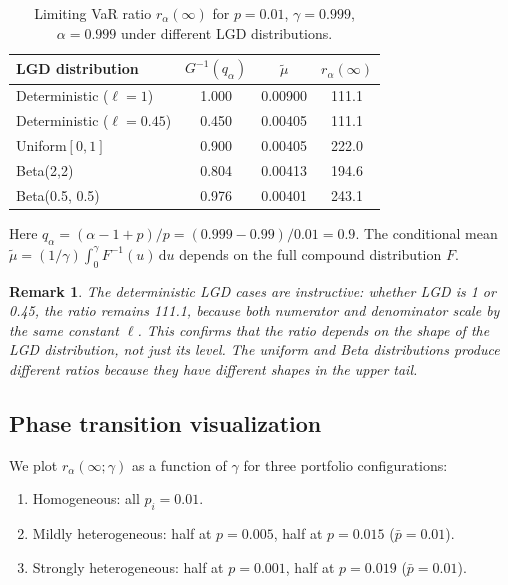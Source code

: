 \documentclass[11pt]{article}
\newtheorem{remark}[theorem]{Remark}
\theoremstyle{definition}
\newcommand{\dd}{\mathrm{d}}
\newcommand{\1}{\mathbf{1}}
\begin{document}
\begin{table}[h]
\centering
\caption{Limiting VaR ratio $r_\alpha(\infty)$ for $p = 0.01$, $\gamma = 0.999$, $\alpha = 0.999$ under different LGD distributions.}
\label{tab:lgd_comparison}
\begin{tabular}{lccc}
\toprule
LGD distribution & $G^{-1}(q_\alpha)$ & $\tilde{\mu}$ & $r_\alpha(\infty)$ \\
\midrule
Deterministic ($\ell = 1$) & 1.000 & 0.00900 & 111.1 \\
Deterministic ($\ell = 0.45$) & 0.450 & 0.00405 & 111.1 \\
Uniform$[0,1]$ & 0.900 & 0.00405 & 222.0 \\
Beta(2,2) & 0.804 & 0.00413 & 194.6 \\
Beta(0.5, 0.5) & 0.976 & 0.00401 & 243.1 \\
\bottomrule
\end{tabular}
\begin{flushleft}
\small Here $q_\alpha = (\alpha - 1 + p)/p = (0.999 - 0.99)/0.01 = 0.9$. The conditional mean $\tilde{\mu} = (1/\gamma)\int_0^\gamma F^{-1}(u)\,\dd u$ depends on the full compound distribution $F$.
\end{flushleft}
\end{table}

\begin{remark}
The deterministic LGD cases are instructive: whether LGD is 1 or 0.45, the ratio remains 111.1, because both numerator and denominator scale by the same constant $\ell$. This confirms that the ratio depends on the \emph{shape} of the LGD distribution, not just its level. The uniform and Beta distributions produce different ratios because they have different shapes in the upper tail.
\end{remark}

\subsection{Phase transition visualization}

We plot $r_\alpha(\infty; \gamma)$ as a function of $\gamma$ for three portfolio configurations:
\begin{enumerate}[label=(\roman*)]
  \item Homogeneous: all $p_i = 0.01$.
  \item Mildly heterogeneous: half at $p = 0.005$, half at $p = 0.015$ ($\bar{p} = 0.01$).
  \item Strongly heterogeneous: half at $p = 0.001$, half at $p = 0.019$ ($\bar{p} = 0.01$).
\end{enumerate}
\end{document}
